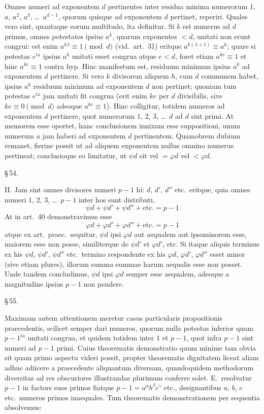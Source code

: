 \documentclass[12pt,a4paper]{article}
\theoremstyle{plain}
\theoremstyle{definition}
\theoremstyle{remark}
\begin{document}
Omnes numeri ad exponentem $d$ pertinentes inter residua minima numerorum $1$, $a$, $a^2$, $a^3$, \dots\ $a^{d-1}$, quorum quisque ad exponentem $d$ pertinet, reperiri. Quales vero sint, quantaque eorum multitudo, ita definitur. Si $k$ est numerus ad $d$ primus, omnes potestates ipsius $a^k$, quarum exponentes $< d$, unitati non erunt congrui: est enim $a^{k\lambda} \equiv 1 \pmod{d}$ (vid.\ art.~31) eritque $a^{k(\lambda+1)} \equiv a^k$; quare si potestas $e^\text{ta}$ ipsius $a^k$ unitati esset congrua atque $e < d$, foret etiam $a^{ke} \equiv 1$ et hinc $a^{ke} \equiv 1$ contra hyp. Hinc manifestum est, residuum minimum ipsius $a^k$ ad exponentem $d$ pertinere. Si vero $k$ divisorem aliquem $h$, cum $d$ communem habet, ipsius $a^k$ residuum minimum ad exponentem $d$ non pertinet; quoniam tum potestas $e^\text{ta}$ jam unitati fit congrua (erit enim $ke$ per $d$ divisibilis, sive $ke \equiv 0 \pmod{d}$ adeoque $a^{ke} \equiv 1$). Hinc colligitur, totidem numeros ad exponentem $d$ pertinere, quot numerorum $1$, $2$, $3$, \dots\ $d$ ad $d$ sint primi. At memorem esse oportet, hanc conclusionem innixam esse suppositioni, unum numerum $a$ jam haberi ad exponentem $d$ pertinentem. Quamobrem dubium remanet, fierine possit ut ad aliquem exponentem nullus omnino numerus pertineat; conclusioque eo limitatur, ut $\psi d$ sit vel $= \varphi d$ vel $< \varphi d$.

\begin{center}\S\,54.\end{center}

II. Jam sint omnes divisores numeri $p-1$ hi: $d$, $d'$, $d''$ etc.\ eritque, quia omnes numeri $1$, $2$, $3$, \dots\ $p-1$ inter hos sunt distributi,
\[
\psi d + \psi d' + \psi d'' + \text{etc.} = p - 1
\]
At in art.~40 demonstravimus esse
\[
\varphi d + \varphi d' + \varphi d'' + \text{etc.} = p - 1
\]
atque ex art.\ praec.\ sequitur, $\psi d$ ipsi $\varphi d$ aut aequalem aut ipsominorem esse, maiorem esse non posse, similiterque de $\psi d'$ et $\varphi d'$, etc. Si itaque aliquis terminus ex his $\psi d$, $\psi d'$, $\psi d''$ etc.\ termino respondente ex his $\varphi d$, $\varphi d'$, $\varphi d''$ esset minor (sive etiam plures), illorum summa summae harum aequalis esse non posset. Unde tandem concludimus, $\psi d$ ipsi $\varphi d$ semper esse aequalem, adeoque a magnitudine ipsius $p-1$ non pendere.

\begin{center}\S\,55.\end{center}

Maximam autem attentionem meretur casus particularis propositionis praecedentis, scilicet semper dari numeros, quorum nulla potestas inferior quam $p-1^\text{ta}$ unitati congrua, et quidem totidem inter $1$ et $p-1$, quot infra $p-1$ sint numeri ad $p-1$ primi. Cuius theorematis demonstratio quum minime tam obvia sit quam primo aspectu videri possit, propter theorematis dignitatem liceat aliam adhuc adiicere a praecedente aliquantum diversam, quandoquidem methodorum diversitas ad res obscuriores illustrandas plurimum conferre solet. E.\ resolvatur $p-1$ in factors suos primos fiatque $p-1 = a^\alpha b^\beta c^\gamma$ etc., designantibus $a$, $b$, $c$ etc.\ numeros primos inaequales. Tum theorematis demonstrationem per sequentia absolvemus:
\end{document}

